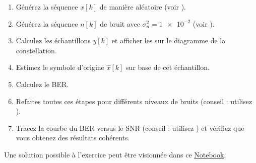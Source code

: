 \documentclass [a4paper, 11pt] {article}
\begin{document}
\begin{exercice}{1}
        \begin{enumerate}
            \item Générez la séquence $x[k]$ de manière aléatoire (voir \href{https://numpy.org/doc/stable/reference/random/generated/numpy.random.randint.html}{}).
            \item Générez la séquence $n[k]$ de bruit avec $\sigma_n^2 = \num{1e-2}$ (voir \href{https://numpy.org/doc/stable/reference/random/generated/numpy.random.randn.html}{}).
            \item Calculez les échantillons $y[k]$ et afficher les sur le diagramme de la constellation.
            \item Estimez le symbole d'origine $\hat{x}[k]$ sur base de cet échantillon.
            \item Calculez le BER.
            \item Refaites toutes ces étapes pour différents niveaux de bruits (conseil : utilisez ).
            \item Tracez la courbe du BER versus le SNR (conseil : utilisez ) et vérifiez que vous obtenez des résultats cohérents.
        \end{enumerate}
    
    \end{exercice}
    
    \begin{reponse}
        Une solution possible à l'exercice peut être visionnée dans ce \href{https://github.com/jeertmans/LELEC1930/blob/main/notebooks/seance4.ipynb}{Notebook}.
    \end{reponse}
\end{document}
